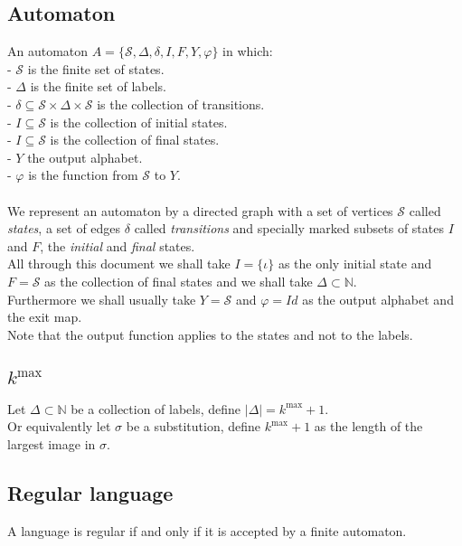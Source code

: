 \documentclass{article}
\begin{document}
\subsection{Automaton}
An automaton $A = \{\mathcal{S}, \Delta, \delta, I, F, Y, \varphi\}$ in which:\\
- $\mathcal{S}$ is the finite set of states.\\
- $\Delta$ is the finite set of labels.\\
- $\delta \subseteq \mathcal{S} \times \Delta \times \mathcal{S}$ is the
collection of transitions.\\
- $I \subseteq \mathcal{S}$ is the collection of initial states.\\
- $I \subseteq \mathcal{S}$ is the collection of final states.\\
- $Y$ the output alphabet.\\
- $\varphi$ is the function from $\mathcal{S}$ to $Y$.\\
\\
We represent an automaton by a directed graph with a set of vertices 
$\mathcal{S}$ called \emph{states}, a set of edges $\delta$ called 
\emph{transitions} and specially marked subsets of states $I$ and $F$, the
\emph{initial} and \emph{final} states.\\
All through this document we shall take $I = \{\iota\}$ as the only initial 
state and $F = \mathcal{S}$ as the collection of final states and we shall
take $\Delta \subset \mathbb{N}$.\\
Furthermore we shall usually take $Y = \mathcal{S}$ and $\varphi = Id$ as the
output alphabet and the exit map.\\
Note that the output function applies to the states and not to the labels.

\subsection{$k^\mathrm{max}$}
Let $\Delta \subset \mathbb{N}$ be a collection of labels, define 
$|\Delta| = k^\mathrm{max} + 1$.\\
Or equivalently let $\sigma$ be a substitution, define $k^\mathrm{max} + 1$ as
the length of the largest image in $\sigma$.

\subsection{Regular language}
A language is regular if and only if it is accepted by a finite automaton.
\end{document}
